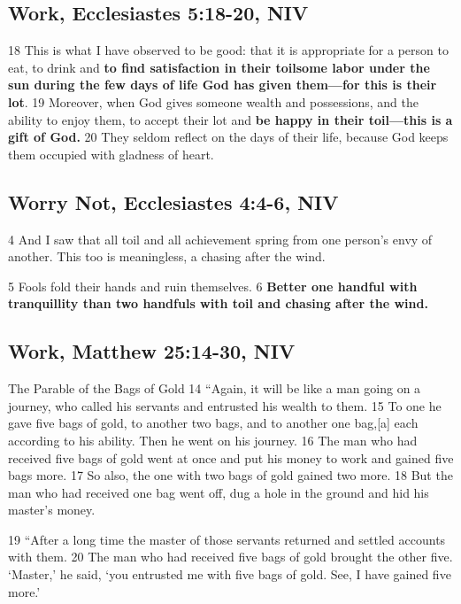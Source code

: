 \documentclass[
]{book}
\begin{document}
\hypertarget{work-ecclesiastes-518-20-niv}{%
\subsection{Work, Ecclesiastes 5:18-20, NIV}\label{work-ecclesiastes-518-20-niv}}

18 This is what I have observed to be good: that it is appropriate for a person to eat, to drink and \textbf{to find satisfaction in their toilsome labor under the sun during the few days of life God has given them---for this is their lot}. 19 Moreover, when God gives someone wealth and possessions, and the ability to enjoy them, to accept their lot and \textbf{be happy in their toil---this is a gift of God.} 20 They seldom reflect on the days of their life, because God keeps them occupied with gladness of heart.

\hypertarget{worry-not-ecclesiastes-44-6-niv}{%
\subsection{Worry Not, Ecclesiastes 4:4-6, NIV}\label{worry-not-ecclesiastes-44-6-niv}}

4 And I saw that all toil and all achievement spring from one person's envy of another. This too is meaningless, a chasing after the wind.

5 Fools fold their hands
and ruin themselves.
6 \textbf{Better one handful with tranquillity
than two handfuls with toil
and chasing after the wind.}

\hypertarget{work-matthew-2514-30-niv}{%
\subsection{Work, Matthew 25:14-30, NIV}\label{work-matthew-2514-30-niv}}

The Parable of the Bags of Gold
14 ``Again, it will be like a man going on a journey, who called his servants and entrusted his wealth to them. 15 To one he gave five bags of gold, to another two bags, and to another one bag,{[}a{]} each according to his ability. Then he went on his journey. 16 The man who had received five bags of gold went at once and put his money to work and gained five bags more. 17 So also, the one with two bags of gold gained two more. 18 But the man who had received one bag went off, dug a hole in the ground and hid his master's money.

19 ``After a long time the master of those servants returned and settled accounts with them. 20 The man who had received five bags of gold brought the other five. `Master,' he said, `you entrusted me with five bags of gold. See, I have gained five more.'
\end{document}
